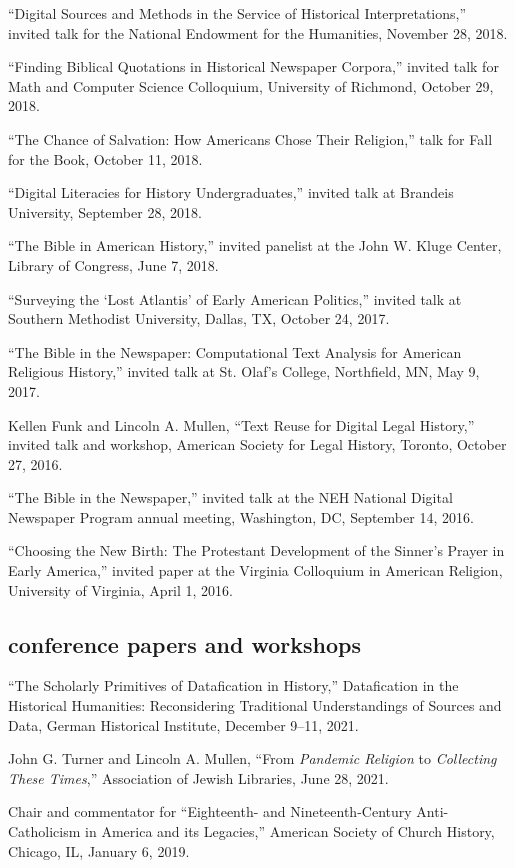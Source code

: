 \documentclass[11pt]{article}
\begin{document}
``Digital Sources and Methods in the Service of Historical Interpretations,'' 
invited talk for the National Endowment for the Humanities, November 28, 
2018.

``Finding Biblical Quotations in Historical Newspaper Corpora,'' invited talk for Math and Computer Science Colloquium, University of Richmond, October 29, 2018.

``The Chance of Salvation: How Americans Chose Their Religion,'' talk for Fall for the Book, October 11, 2018.

``Digital Literacies for History Undergraduates,'' invited talk at Brandeis University, September 28, 2018.

``The Bible in American History,'' invited panelist at the John W. Kluge Center, Library of Congress, June 7, 2018.

``Surveying the `Lost Atlantis' of Early American Politics,'' invited talk at 
Southern Methodist University, Dallas, TX, October 24, 2017.

``The Bible in the Newspaper: Computational Text Analysis for American 
Religious History,'' invited talk at St. Olaf's College, Northfield, MN, May 
9, 2017.

Kellen Funk and Lincoln A. Mullen, ``Text Reuse for Digital Legal History,'' 
invited talk and workshop, American Society for Legal History, Toronto, October 27, 2016.

``The Bible in the Newspaper,'' invited talk at the NEH National Digital Newspaper Program annual meeting, Washington, DC, September 14, 2016.

``Choosing the New Birth: The Protestant Development of the Sinner's Prayer in 
Early America,'' invited paper at the Virginia Colloquium in American 
Religion, University of Virginia, April 1, 2016.

\subsection{conference papers and workshops}\label{conference-papers}


``The Scholarly Primitives of Datafication in History,'' Datafication in the
Historical Humanities: Reconsidering Traditional Understandings of Sources and
Data, German Historical Institute, December 9--11, 2021.

John G. Turner and Lincoln A. Mullen, ``From \emph{Pandemic Religion} to \emph{Collecting These Times},'' Association of Jewish Libraries, June 28, 2021.

Chair and commentator for ``Eighteenth- and Nineteenth-Century Anti-Catholicism in America and its Legacies,'' American Society of Church History, Chicago, IL, January 6, 2019.
\end{document}
